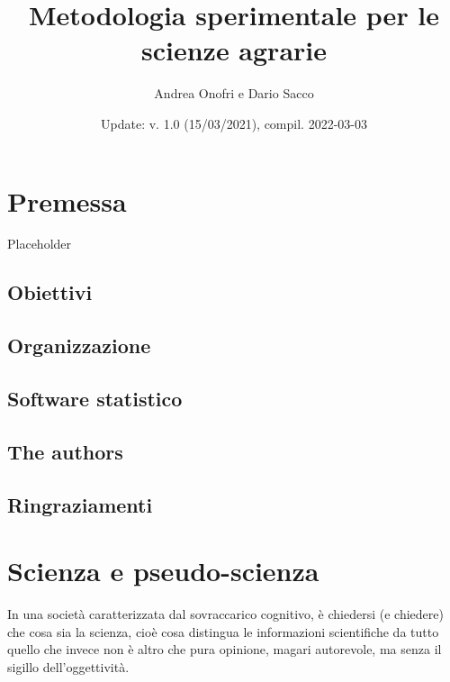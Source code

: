 \documentclass[a4paper,12pt,oneside]{book}
\author{Andrea Onofri e Dario Sacco}
\date{Update: v. 1.0 (15/03/2021), compil. 2022-03-03}
\title{Metodologia sperimentale per le scienze agrarie}
\subtitle{}
\begin{document}
\maketitle
\tableofcontents

\hypertarget{premessa}{%
\chapter*{Premessa}\label{premessa}}

Placeholder

\hypertarget{obiettivi}{%
\section*{Obiettivi}\label{obiettivi}}

\hypertarget{organizzazione}{%
\section*{Organizzazione}\label{organizzazione}}

\hypertarget{software-statistico}{%
\section*{Software statistico}\label{software-statistico}}

\hypertarget{the-authors}{%
\section*{The authors}\label{the-authors}}

\hypertarget{ringraziamenti}{%
\section*{Ringraziamenti}\label{ringraziamenti}}

\hypertarget{scienza-e-pseudo-scienza}{%
\chapter{Scienza e pseudo-scienza}\label{scienza-e-pseudo-scienza}}

In una società caratterizzata dal sovraccarico cognitivo, è chiedersi (e chiedere) che cosa sia la scienza, cioè cosa distingua le informazioni scientifiche da tutto quello che invece non è altro che pura opinione, magari autorevole, ma senza il sigillo dell'oggettività.
\end{document}
